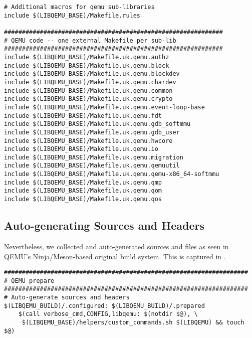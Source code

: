\begin{lstlisting}
# Additional macros for qemu sub-libraries
include $(LIBQEMU_BASE)/Makefile.rules

#############################################################
# QEMU code -- one external Makefile per sub-lib
#############################################################
include $(LIBQEMU_BASE)/Makefile.uk.qemu.authz
include $(LIBQEMU_BASE)/Makefile.uk.qemu.block
include $(LIBQEMU_BASE)/Makefile.uk.qemu.blockdev
include $(LIBQEMU_BASE)/Makefile.uk.qemu.chardev
include $(LIBQEMU_BASE)/Makefile.uk.qemu.common
include $(LIBQEMU_BASE)/Makefile.uk.qemu.crypto
include $(LIBQEMU_BASE)/Makefile.uk.qemu.event-loop-base
include $(LIBQEMU_BASE)/Makefile.uk.qemu.fdt
include $(LIBQEMU_BASE)/Makefile.uk.qemu.gdb_softmmu
include $(LIBQEMU_BASE)/Makefile.uk.qemu.gdb_user
include $(LIBQEMU_BASE)/Makefile.uk.qemu.hwcore
include $(LIBQEMU_BASE)/Makefile.uk.qemu.io
include $(LIBQEMU_BASE)/Makefile.uk.qemu.migration
include $(LIBQEMU_BASE)/Makefile.uk.qemu.qemuutil
include $(LIBQEMU_BASE)/Makefile.uk.qemu.qemu-x86_64-softmmu
include $(LIBQEMU_BASE)/Makefile.uk.qemu.qmp
include $(LIBQEMU_BASE)/Makefile.uk.qemu.qom
include $(LIBQEMU_BASE)/Makefile.uk.qemu.qos
\end{lstlisting}

\subsection{Auto-generating Sources and Headers}
\label{subsec:autogenerating-sources-headers}

Nevertheless, we collected and auto-generated sources and files as seen in QEMU's Ninja/Meson-based original build system.
This is captured in .

\begin{lstlisting}
####################################################################
# QEMU prepare
####################################################################
# Auto-generate sources and headers
$(LIBQEMU_BUILD)/.configured: $(LIBQEMU_BUILD)/.prepared
    $(call verbose_cmd,CONFIG,libqemu: $(notdir $@), \
     $(LIBQEMU_BASE)/helpers/custom_commands.sh $(LIBQEMU) && touch $@)
\end{lstlisting}

